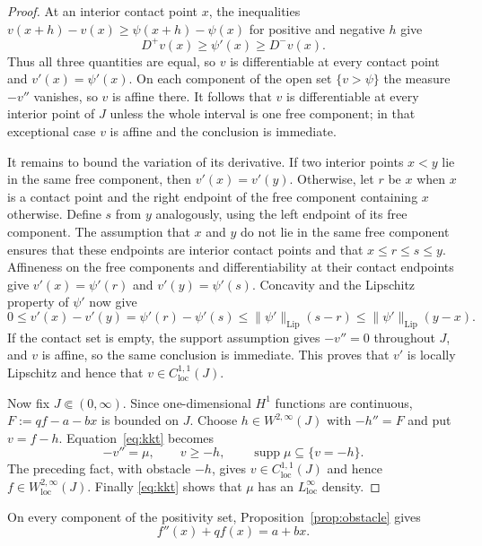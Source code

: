 \documentclass[11pt]{amsart}
\theoremstyle{definition}
\theoremstyle{remark}
\begin{document}
\begin{proof}
At an interior contact point $x$, the inequalities
$v(x+h)-v(x)\geq\psi(x+h)-\psi(x)$ for positive and negative $h$ give
\[
 D^+v(x)\geq\psi'(x)\geq D^-v(x).
\]
Thus all three quantities are equal, so $v$ is differentiable at every
contact point and $v'(x)=\psi'(x)$. On each component of the open set
$\{v>\psi\}$ the measure $-v''$ vanishes, so $v$ is affine there. It follows
that $v$ is differentiable at every interior point of $J$ unless the whole
interval is one free component; in that exceptional case $v$ is affine and
the conclusion is immediate.

It remains to bound the variation of its derivative. If two interior points
$x<y$ lie in the same free component, then $v'(x)=v'(y)$. Otherwise, let $r$
be $x$ when $x$ is a contact point and the right endpoint of the free
component containing $x$ otherwise. Define $s$ from $y$ analogously, using
the left endpoint of its free component. The assumption that $x$ and $y$ do
not lie in the same free component ensures that these endpoints are interior
contact points and that
$x\leq r\leq s\leq y$. Affineness on the free components and differentiability
at their contact endpoints give
$v'(x)=\psi'(r)$ and $v'(y)=\psi'(s)$. Concavity and the Lipschitz property of
$\psi'$ now give
\[
 0\leq v'(x)-v'(y)
 = \psi'(r)-\psi'(s)
 \leq \|\psi'\|_{\mathrm{Lip}}(s-r)
 \leq \|\psi'\|_{\mathrm{Lip}}(y-x).
\]
If the contact set is empty, the support assumption gives
$-v''=0$ throughout $J$, and $v$ is affine, so the same conclusion is
immediate. This proves that $v'$ is locally Lipschitz and hence that
$v\in C^{1,1}_{\mathrm{loc}}(J)$.

Now fix $J\Subset(0,\infty)$. Since one-dimensional $H^1$ functions are
continuous, $F:=qf-a-bx$ is bounded on $J$. Choose
$h\in W^{2,\infty}(J)$ with $-h''=F$ and put $v=f-h$. Equation~\eqref{eq:kkt}
becomes
\[
 -v''=\mu,
 \qquad v\geq-h,
 \qquad \operatorname{supp}\mu\subseteq\{v=-h\}.
\]
The preceding fact, with obstacle $-h$, gives
$v\in C^{1,1}_{\mathrm{loc}}(J)$ and hence
$f\in W^{2,\infty}_{\mathrm{loc}}(J)$. Finally
\eqref{eq:kkt} shows that $\mu$ has an $L^\infty_{\mathrm{loc}}$ density.
\end{proof}

On every component of the positivity set, Proposition~\ref{prop:obstacle} gives
\begin{equation}\label{eq:ode}
 f''(x)+qf(x)=a+bx.
\end{equation}
\end{document}
